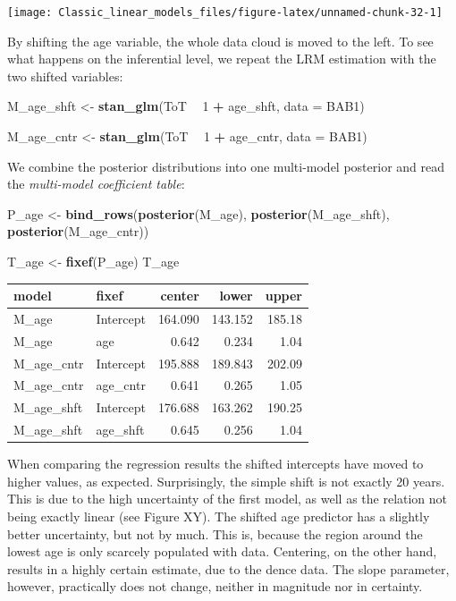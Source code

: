 \documentclass[]{svmono}
\newenvironment{Shaded}{\begin{snugshade}}{\end{snugshade}}
\newcommand{\KeywordTok}[1]{\textcolor[rgb]{0.13,0.29,0.53}{\textbf{#1}}}
\newcommand{\DataTypeTok}[1]{\textcolor[rgb]{0.13,0.29,0.53}{#1}}
\newcommand{\DecValTok}[1]{\textcolor[rgb]{0.00,0.00,0.81}{#1}}
\newcommand{\StringTok}[1]{\textcolor[rgb]{0.31,0.60,0.02}{#1}}
\newcommand{\OperatorTok}[1]{\textcolor[rgb]{0.81,0.36,0.00}{\textbf{#1}}}
\newcommand{\NormalTok}[1]{#1}
\begin{document}
\texttt{[image: Classic\_linear\_models\_files/figure-latex/unnamed-chunk-32-1]}

By shifting the age variable, the whole data cloud is moved to the left.
To see what happens on the inferential level, we repeat the LRM
estimation with the two shifted variables:

\begin{Shaded}
\begin{Highlighting}[]
\NormalTok{M_age_shft <-}\StringTok{ }
\StringTok{  }\KeywordTok{stan_glm}\NormalTok{(ToT }\OperatorTok{~}\StringTok{ }\DecValTok{1} \OperatorTok{+}\StringTok{ }\NormalTok{age_shft, }\DataTypeTok{data =}\NormalTok{ BAB1)}

\NormalTok{M_age_cntr <-}\StringTok{ }
\StringTok{  }\KeywordTok{stan_glm}\NormalTok{(ToT }\OperatorTok{~}\StringTok{ }\DecValTok{1} \OperatorTok{+}\StringTok{ }\NormalTok{age_cntr, }\DataTypeTok{data =}\NormalTok{ BAB1)}
\end{Highlighting}
\end{Shaded}

We combine the posterior distributions into one multi-model posterior
and read the \emph{multi-model coefficient table}:

\begin{Shaded}
\begin{Highlighting}[]
\NormalTok{P_age <-}\StringTok{ }
\StringTok{  }\KeywordTok{bind_rows}\NormalTok{(}\KeywordTok{posterior}\NormalTok{(M_age), }
            \KeywordTok{posterior}\NormalTok{(M_age_shft), }
            \KeywordTok{posterior}\NormalTok{(M_age_cntr))}


\NormalTok{T_age <-}\StringTok{ }\KeywordTok{fixef}\NormalTok{(P_age)}
\NormalTok{T_age}
\end{Highlighting}
\end{Shaded}

\begin{longtable}[]{@{}llrrr@{}}
\toprule
model & fixef & center & lower & upper\tabularnewline
\midrule
\endhead
M\_age & Intercept & 164.090 & 143.152 & 185.18\tabularnewline
M\_age & age & 0.642 & 0.234 & 1.04\tabularnewline
M\_age\_cntr & Intercept & 195.888 & 189.843 & 202.09\tabularnewline
M\_age\_cntr & age\_cntr & 0.641 & 0.265 & 1.05\tabularnewline
M\_age\_shft & Intercept & 176.688 & 163.262 & 190.25\tabularnewline
M\_age\_shft & age\_shft & 0.645 & 0.256 & 1.04\tabularnewline
\bottomrule
\end{longtable}

When comparing the regression results the shifted intercepts have moved
to higher values, as expected. Surprisingly, the simple shift is not
exactly 20 years. This is due to the high uncertainty of the first
model, as well as the relation not being exactly linear (see Figure XY).
The shifted age predictor has a slightly better uncertainty, but not by
much. This is, because the region around the lowest age is only scarcely
populated with data. Centering, on the other hand, results in a highly
certain estimate, due to the dence data. The slope parameter, however,
practically does not change, neither in magnitude nor in certainty.
\end{document}
